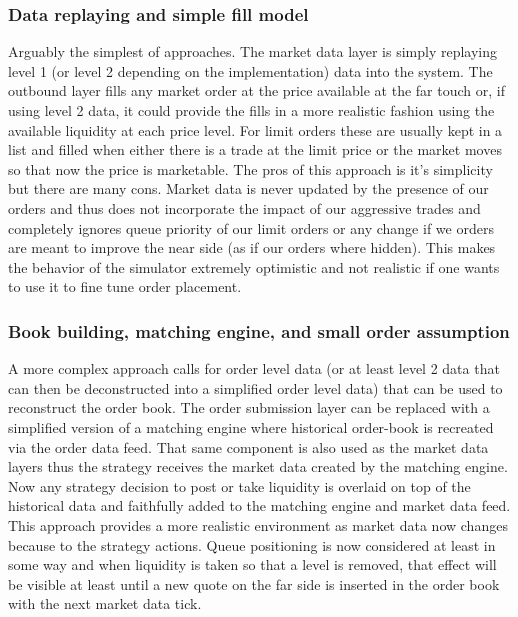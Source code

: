 \subsubsection{Data replaying and simple fill model}

Arguably the simplest of approaches. The market data layer is simply replaying level 1 (or level 2 depending on the implementation) data into the system. The outbound layer fills any market order at the price available at the far touch or, if using level 2 data, it could provide the fills in a more realistic fashion using the available liquidity at each price level. For limit orders these are usually kept in a list and filled when either there is a trade at the limit price or the market moves so that now the price is marketable. The pros of this approach is it's simplicity but there are many cons. Market data is never updated by the presence of our orders and thus does not incorporate the impact of our aggressive trades and completely ignores queue priority of our limit orders or any change if we orders are meant to improve the near side (as if our orders where hidden). This makes the behavior of the simulator extremely optimistic and not realistic if one wants to use it to fine tune order placement.



\subsubsection{Book building, matching engine, and small order assumption}

A more complex approach calls for order level data (or at least level 2 data that can then be deconstructed into a simplified order level data) that can be used to reconstruct the order book. The order submission layer can be replaced with a simplified version of a matching engine where historical order-book is recreated via the order data feed. That same component is also used as the market data layers thus the strategy receives the market data created by the matching engine. Now any strategy decision to post or take liquidity is overlaid on top of the historical data and faithfully added to the matching engine and market data feed. This approach provides a more realistic environment as market data now changes because to the strategy actions. Queue positioning is now considered at least in some way and when liquidity is taken so that a level is removed, that effect will be visible at least until a new quote on the far side is inserted in the order book with the next market data tick.


